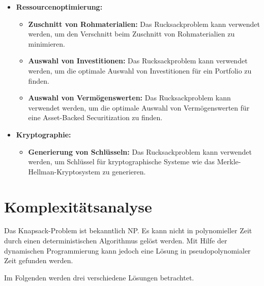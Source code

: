 \documentclass[12pt]{report}
\begin{document}
\begin{itemize}
	\item \textbf{Ressourcenoptimierung:}
	\begin{itemize}
		\item \textbf{Zuschnitt von Rohmaterialien:} Das Rucksackproblem kann verwendet werden, um den Verschnitt beim Zuschnitt von Rohmaterialien zu minimieren.\cite{kellerer2004knapsack} 
		\item \textbf{Auswahl von Investitionen:} Das Rucksackproblem kann verwendet werden, um die optimale Auswahl von Investitionen für ein Portfolio zu finden.\cite{kellerer2004knapsack}
		\item \textbf{Auswahl von Vermögenswerten:} Das Rucksackproblem kann verwendet werden, um die optimale Auswahl von Vermögenswerten für eine Asset-Backed Securitization zu finden.\cite{kellerer2004knapsack}
	\end{itemize}
	\item \textbf{Kryptographie:}
	\begin{itemize}
		\item \textbf{Generierung von Schlüsseln:} Das Rucksackproblem kann verwendet werden, um Schlüssel für kryptographische Systeme wie das Merkle-Hellman-Kryptosystem zu generieren.\cite{kellerer2004knapsack}
	\end{itemize}
\end{itemize}

\section{Komplexitätsanalyse}

\cite{martello1987algorithms}



Das Knapsack-Problem ist bekanntlich NP. Es kann nicht in polynomieller Zeit durch einen deterministischen Algorithmus gelöst werden. Mit Hilfe der dynamischen Programmierung kann jedoch eine Lösung in pseudopolynomialer Zeit gefunden werden. \cite{assi8672677}

Im Folgenden werden drei verschiedene Lösungen betrachtet.
\end{document}
